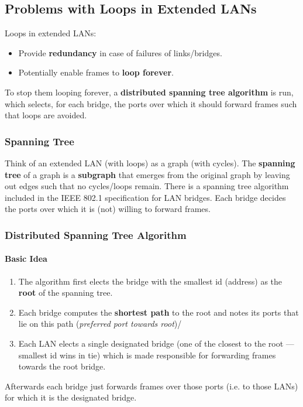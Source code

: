 \documentclass{article}%
\begin{document}
\subsection{Problems with Loops in Extended LANs}
\label{sec:org9a55d1c}
Loops in extended LANs:
\begin{itemize}
\item Provide \textbf{redundancy} in case of failures of links/bridges.
\item Potentially enable frames to \textbf{loop forever}.
\end{itemize}
To stop them looping forever, a \textbf{distributed spanning tree algorithm} is run, which selects, for each bridge, the ports over which it should forward frames such that loops are avoided.

\subsubsection{Spanning Tree}
\label{sec:org8489571}
Think of an extended LAN (with loops) as a graph (with cycles).
The \textbf{spanning tree} of a graph is a \textbf{subgraph} that emerges from the original graph by leaving out edges such that no cycles/loops remain.
There is a spanning tree algorithm included in the IEEE 802.1 specification for LAN bridges.
Each bridge decides the ports over which it is (not) willing to forward frames.

\subsubsection{Distributed Spanning Tree Algorithm}
\label{sec:org34e4572}
\paragraph{Basic Idea}
\label{sec:org6efdf2e}
\begin{enumerate}
\item The algorithm first elects the bridge with the smallest id (address) as the \textbf{root} of the spanning tree.
\item Each bridge computes the \textbf{shortest path} to the root and notes its ports that lie on this path (\emph{preferred port towards root})/
\item Each LAN elects a single designated bridge (one of the closest to the root --- smallest id wins in tie) which is made responsible for forwarding frames towards the root bridge.
\end{enumerate}
Afterwards each bridge just forwards frames over those ports (i.e. to those LANs) for which it is the designated bridge.
\end{document}
